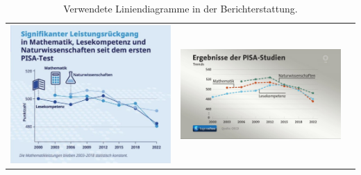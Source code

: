 \documentclass[
  jou,
  floatsintext,
  longtable,
  nolmodern,
  notxfonts,
  notimes,
  colorlinks=true,linkcolor=blue,citecolor=blue,urlcolor=blue]{apa7}
\begin{document}
\begin{ThreePartTable}

\begin{longtable}[]{@{}
  >{\raggedright\arraybackslash}p{}
  >{\raggedright\arraybackslash}p{}
  >{\raggedright\arraybackslash}p{}@{}}
\caption{Verwendete Liniendiagramme in der
Berichterstattung.}\label{tbl-pisalinegraphs}\tabularnewline
\toprule\noalign{}
\endfirsthead
\endhead
\bottomrule\noalign{}
\endlastfoot
\includegraphics[width=9.375in,height=\textheight,keepaspectratio]{img/oecd.png}
&
\includegraphics[width=9.375in,height=\textheight,keepaspectratio]{img/tagessschau.jpg}
&

\end{longtable}
\end{ThreePartTable}
\end{document}
